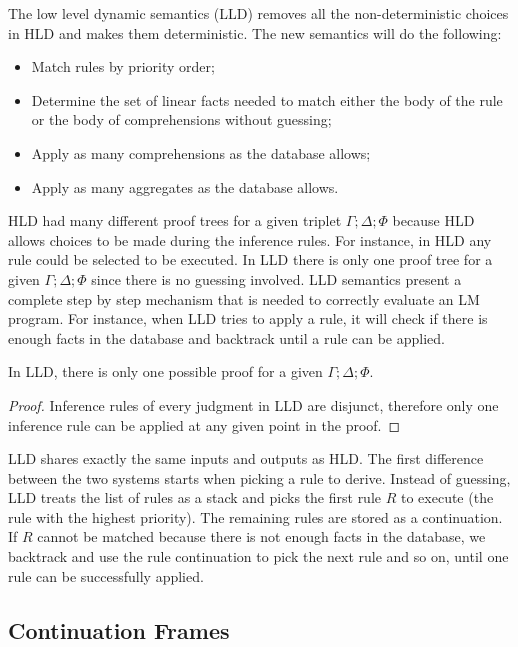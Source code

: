 The low level dynamic semantics (LLD) removes all the non-deterministic choices in HLD
and makes them deterministic. The new semantics will do the following:

\begin{itemize}
   \item Match rules by priority order;
   \item Determine the set of linear facts needed to match either the body of the rule or the body of comprehensions without guessing;
   \item Apply as many comprehensions as the database allows;
   \item Apply as many aggregates as the database allows.
\end{itemize}

HLD had many different proof trees for a given triplet $\Gamma; \Delta; \Phi$ because HLD allows choices to be made during the inference rules. For instance, in HLD any rule could be selected to be executed. In LLD there is only one proof tree
for a given $\Gamma; \Delta; \Phi$ since there is no guessing involved. LLD semantics present a complete step by step mechanism that is needed to correctly evaluate an LM program. For instance, when LLD tries to apply a rule, it will check if there is enough
facts in the database and backtrack until a rule can be applied.

\begin{theorem}
In LLD, there is only one possible proof for a given $\Gamma; \Delta; \Phi$.
\end{theorem}

\begin{proof}
Inference rules of every judgment in LLD are disjunct, therefore only one inference rule can be applied at any given point in the proof.
\end{proof}

LLD shares exactly the same inputs and outputs as HLD. The first difference between the two systems starts when picking a rule to derive.
Instead of guessing, LLD treats the list of rules as a stack and picks the first rule $R$ to execute (the rule with the highest priority). The remaining rules are stored as a continuation. If $R$ cannot be matched because there is not enough facts in the database,
we backtrack and use the rule continuation to pick the next rule and so on, until one rule can be successfully applied.

\subsection{Continuation Frames}


